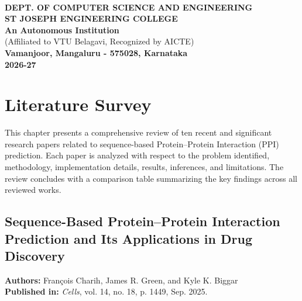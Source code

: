 \documentclass[12pt,a4paper]{report}
\begin{document}
\begin{titlepage}
\begin{center}
         \\[1cm]

        {\large \textbf{DEPT. OF COMPUTER SCIENCE AND ENGINEERING}} \\[0.2cm]
        {\large \textbf{ST JOSEPH ENGINEERING COLLEGE}} \\[0.1cm]
        \textbf{An Autonomous Institution} \\[0.1cm]
        {\small (Affiliated to VTU Belagavi, Recognized by AICTE)} \\[0.1cm]
        \textbf{Vamanjoor, Mangaluru - 575028, Karnataka} \\[0.5cm]
        \textbf{2026-27}
    \end{center}
\end{titlepage}

\newpage

\setcounter{page}{2}
\tableofcontents
\newpage

\setcounter{page}{3}
\chapter{Literature Survey}

This chapter presents a comprehensive review of ten recent and significant research papers related to sequence-based Protein–Protein Interaction (PPI) prediction. Each paper is analyzed with respect to the problem identified, methodology, implementation details, results, inferences, and limitations. The review concludes with a comparison table summarizing the key findings across all reviewed works.

\newpage

\section{Sequence-Based Protein–Protein Interaction Prediction and Its Applications in Drug Discovery}
\textbf{Authors:} Fran\c{c}ois Charih, James R. Green, and Kyle K. Biggar \\
\textbf{Published in:} \textit{Cells}, vol. 14, no. 18, p. 1449, Sep. 2025.
\end{document}
